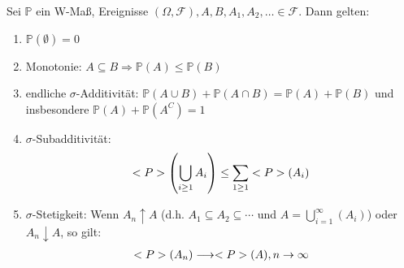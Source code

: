 \begin{proposition}
	Sei $\mathbb{P}$ ein W-Maß, Ereignisse $(\Omega, \mathscr{F}), A, B, A_1, A_2, \dots \in \mathscr{F}$. Dann gelten:
	\begin{enumerate}
		\item $\mathbb{P}(\emptyset) = 0$
		\item Monotonie: $A \subseteq B \Rightarrow \mathbb{P}(A) \le \mathbb{P}(B)$
		\item endliche $\sigma$-Additivität: $\mathbb{P}(A\cup B) + \mathbb{P}(A\cap B) = \mathbb{P}(A) + \mathbb{P}(B)$ und insbesondere $\mathbb{P}(A) + \mathbb{P}(A^C) = 1$
		\item $\sigma$-Subadditivität:
		\begin{align}
			\mathbb{P}\left(\bigcup_{i \ge 1} A_i\right) \le \sum_{1 \ge 1} \mathbb{P}(A_i)\notag
		\end{align}
		\item $\sigma$-Stetigkeit: Wenn $A_n \uparrow A$ (d.h. $A_1 \subseteq A_2 \subseteq \cdots$ und $A = \bigcup_{i=1}^{\infty} (A_i)$) oder $A_n \downarrow A$, so gilt:
		\begin{align}
			\mathbb{P}(A_n) \longrightarrow \mathbb{P}(A), n \to \infty \notag
		\end{align}
	\end{enumerate}
\end{proposition}

